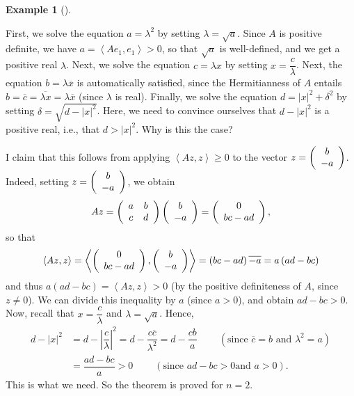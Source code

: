 \documentclass[numbers=enddot,12pt,final,onecolumn,notitlepage]{scrartcl}%
\numberwithin{exer}{subsection}
\theoremstyle{definition}
\newtheorem{exam}[theo]{Example}
\newenvironment{example}[1][]
{\begin{exam}[#1]\begin{leftbar}}
{\end{leftbar}\end{exam}}
\begin{document}
\begin{example}
First, we solve the equation $a=\lambda^{2}$ by setting $\lambda=\sqrt{a}$.
Since $A$ is positive definite, we have $a=\left\langle Ae_{1},e_{1}%
\right\rangle >0$, so that $\sqrt{a}$ is well-defined, and we get a positive
real $\lambda$. Next, we solve the equation $c=\lambda x$ by setting
$x=\dfrac{c}{\lambda}$. Next, the equation $b=\lambda\overline{x}$ is
automatically satisfied, since the Hermitianness of $A$ entails $b=\overline
{c}=\overline{\lambda x}=\lambda\overline{x}$ (since $\lambda$ is real).
Finally, we solve the equation $d=\left\vert x\right\vert ^{2}+\delta^{2}$ by
setting $\delta=\sqrt{d-\left\vert x\right\vert ^{2}}$. Here, we need to
convince ourselves that $d-\left\vert x\right\vert ^{2}$ is a positive real,
i.e., that $d>\left\vert x\right\vert ^{2}$. Why is this the case?

I claim that this follows from applying $\left\langle Az,z\right\rangle \geq0$
to the vector $z=\left(
\begin{array}
[c]{c}%
b\\
-a
\end{array}
\right)  $. Indeed, setting $z=\left(
\begin{array}
[c]{c}%
b\\
-a
\end{array}
\right)  $, we obtain%
\[
Az=\left(
\begin{array}
[c]{cc}%
a & b\\
c & d
\end{array}
\right)  \left(
\begin{array}
[c]{c}%
b\\
-a
\end{array}
\right)  =\left(
\begin{array}
[c]{c}%
0\\
bc-ad
\end{array}
\right)  ,
\]
so that%
\[
\left\langle Az,z\right\rangle =\left\langle \left(
\begin{array}
[c]{c}%
0\\
bc-ad
\end{array}
\right)  ,\left(
\begin{array}
[c]{c}%
b\\
-a
\end{array}
\right)  \right\rangle =\left(  bc-ad\right)  \overline{-a}=a\left(
ad-bc\right)
\]
and thus $a\left(  ad-bc\right)  =\left\langle Az,z\right\rangle >0$ (by the
positive definiteness of $A$, since $z\neq0$). We can divide this inequality
by $a$ (since $a>0$), and obtain $ad-bc>0$. Now, recall that $x=\dfrac
{c}{\lambda}$ and $\lambda=\sqrt{a}$. Hence,%
\begin{align*}
d-\left\vert x\right\vert ^{2}  &  =d-\left\vert \dfrac{c}{\lambda}\right\vert
^{2}=d-\dfrac{c\overline{c}}{\lambda^{2}}=d-\dfrac{cb}{a}%
\ \ \ \ \ \ \ \ \ \ \left(  \text{since }\overline{c}=b\text{ and }\lambda
^{2}=a\right) \\
&  =\dfrac{ad-bc}{a}>0\ \ \ \ \ \ \ \ \ \ \left(  \text{since }ad-bc>0\text{
and }a>0\right)  .
\end{align*}
This is what we need. So the theorem is proved for $n=2$.
\end{example}
\end{document}
